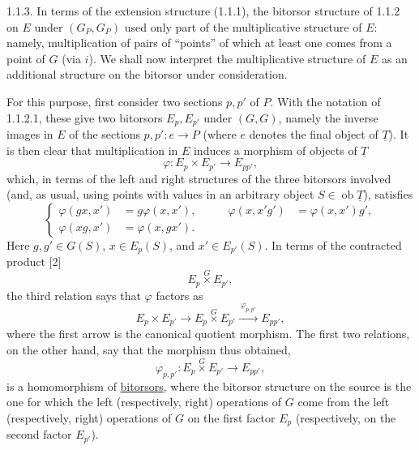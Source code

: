 
1.1.3. In terms of the extension structure (1.1.1), the bitorsor
structure of 1.1.2 on $E$ under $(G_P,G_P)$ used only part of the
multiplicative structure of $E$: namely, multiplication of pairs of
``points'' of which at least one comes from a point of $G$ (via $i$). We
shall now interpret the multiplicative structure of $E$ as an additional
structure on the bitorsor under consideration.


For this purpose, first consider two sections $p,p'$ of $P$. With the
notation of 1.1.2.1, these give two bitorsors $E_p,E_{p'}$ under $(G,G)$,
namely the inverse images in $E$ of the sections
$p,p':e\longrightarrow P$ (where $e$ denotes the final object of
$\underline T$). It is then clear that multiplication in $E$ induces a
morphism of objects of $\underline T$
\[
 \varphi:E_p\times E_{p'}\longrightarrow E_{pp'},
\]
which, in terms of the left and right structures of the three bitorsors
involved (and, as usual, using points with values in an arbitrary object
$S\in\operatorname{ob}\underline T$), satisfies
\begin{equation}\tag{1.1.3.0}
\left\{
\begin{aligned}
 \varphi(gx,x')&=g\varphi(x,x'),
 &\qquad \varphi(x,x'g')&=\varphi(x,x')g',\\
 \varphi(xg,x')&=\varphi(x,gx').
\end{aligned}
\right.
\end{equation}
Here $g,g'\in G(S)$, $x\in E_p(S)$, and $x'\in E_{p'}(S)$. In terms of
the contracted product [2]
\[
 E_p\mathbin{\overset{G}{\times}}E_{p'},
\]
the third relation says that $\varphi$ factors as
\[
 E_p\times E_{p'}\longrightarrow
 E_p\mathbin{\overset{G}{\times}}E_{p'}
 \xrightarrow{\ \varphi_{p,p'}\ }E_{pp'},
\]
where the first arrow is the canonical quotient morphism. The first two
relations, on the other hand, say that the morphism thus obtained,
\begin{equation}\tag{1.1.3.1}
 \varphi_{p,p'}:
 E_p\mathbin{\overset{G}{\times}}E_{p'}\longrightarrow E_{pp'},
\end{equation}
is a homomorphism of \underline{bitorsors}, where the bitorsor structure
on the source is the one for which the left (respectively, right)
operations of $G$ come from the left (respectively, right) operations of
$G$ on the first factor $E_p$ (respectively, on the second factor
$E_{p'}$).

